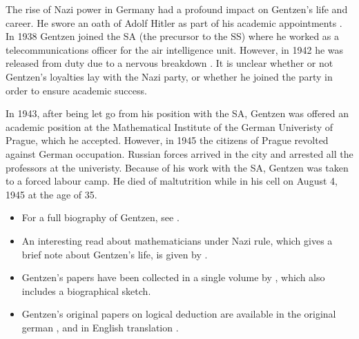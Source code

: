 \documentclass[../../../include/open-logic-section]{subfiles}
\begin{document}
The rise of Nazi power in Germany had a profound impact on Gentzen's life
and career. He swore an oath of Adolf Hitler as part
of his academic appointments \citep[119]{Menzler-Trott2007}.
In 1938 Gentzen joined the SA (the precursor to the SS) where he
worked as a telecommunications officer for the air intelligence
unit\citep[469]{Segal2014}. However, in 1942 he was released from duty due
to a nervous breakdown \citep[469]{Segal2014}. It is unclear whether or not
Gentzen's loyalties lay with the Nazi party, or whether he joined the party
 in order to ensure academic success.

In 1943, after being let go from his position with the SA, Gentzen was offered 
an academic position at the Mathematical Institute of the
German Univeristy of Prague, which he accepted. However, in 1945 the
citizens of Prague revolted against German occupation. Russian forces
arrived in the city and arrested all the professors at the univeristy.
Because of his work with the SA, Gentzen was taken to a forced labour camp. He
died of maltutrition while in his cell on August 4, 1945 at the age of 35.

\begin{reading}
\begin{itemize}
\item For a full biography of Gentzen, see \citet{Menzler-Trott2007}.

\item An interesting read about mathematicians under Nazi rule, which gives a
brief note about Gentzen's life, is given by \citet{Segal2014}.

\item Gentzen's papers have been collected in a single volume by 
\citet{Gentzen1969}, which also includes a biographical sketch.

\item Gentzen's original papers on logical deduction are available in the
original german \citep{Gentzen1935a,Gentzen1935b}, and in English 
translation \citep{Gentzen1969}.

\end{itemize}
\end{reading}
\end{document}
